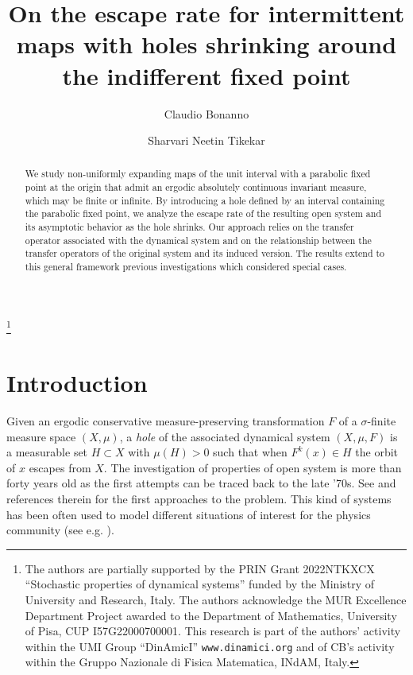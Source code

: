 \documentclass{amsart}
\theoremstyle{definition}
\theoremstyle{remark}
\theoremstyle{definition}
\numberwithin{equation}{section}
\begin{document}
\title[]{On the escape rate for intermittent maps with holes shrinking around the indifferent fixed point}
\author{Claudio Bonanno}
\address{Dipartimento di Matematica, Universit\`a di Pisa, Largo Bruno Pontecorvo 5, 56127 Pisa, Italy}
%
\author{Sharvari Neetin Tikekar}
\address{Dipartimento di Matematica, Universit\`a di Pisa, Largo Bruno Pontecorvo 5, 56127 Pisa, Italy}

\begin{abstract}
We study non-uniformly expanding maps of the unit interval with a parabolic fixed point at the origin that admit an ergodic absolutely continuous invariant measure, which may be finite or infinite. By introducing a hole defined by an interval containing the parabolic fixed point, we analyze the escape rate of the resulting open system and its asymptotic behavior as the hole shrinks. Our approach relies on the transfer operator associated with the dynamical system and on the relationship between the transfer operators of the original system and its induced version. The results extend to this general framework previous investigations which considered special cases.
\end{abstract}

\thanks{The authors are partially supported by 
the PRIN Grant 2022NTKXCX ``Stochastic properties of dynamical systems'' funded by the Ministry of University and Research, Italy. The authors acknowledge the MUR Excellence Department Project awarded to the Department of Mathematics, University of Pisa, CUP I57G22000700001. This research is part of the authors' activity within the UMI Group ``DinAmicI'' \texttt{www.dinamici.org} and of CB's activity within the Gruppo Nazionale di Fisica Matematica, INdAM, Italy.}

\maketitle

\section{Introduction} \label{sec:intro}

Given an ergodic conservative measure-preserving transformation $F$ of a $\sigma$-finite measure space $(X,\mu)$, a \emph{hole} of the associated dynamical system $(X,\mu,F)$ is a measurable set $H\subset X$ with $\mu(H)>0$ such that when $F^k(x) \in H$ the orbit of $x$ escapes from $X$. The investigation of properties of open system is more than forty years old as the first attempts can be traced back to the late '70s. See  \cite{PY79,FKMP95} and references therein for the first approaches to the problem. This kind of systems has been often used to model different situations of interest for the  physics community (see e.g. \cite{APT13}). 
\end{document}
